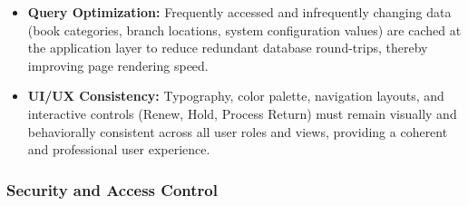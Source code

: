 \begin{itemize}




    \item \textbf{Query Optimization:} Frequently accessed and infrequently changing data (book categories, branch locations, system configuration values) are cached at the application layer to reduce redundant database round-trips, thereby improving page rendering speed.



    \item \textbf{UI/UX Consistency:} Typography, color palette, navigation layouts, and interactive controls (Renew, Hold, Process Return) must remain visually and behaviorally consistent across all user roles and views, providing a coherent and professional user experience.

\end{itemize}



\subsubsection{Security and Access Control}



